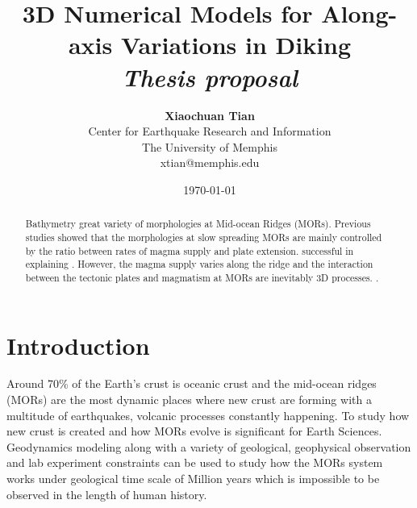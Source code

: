 \documentclass[12pt]{article}
\title{{\bf 3D Numerical Models for Along-axis Variations in Diking\note[EC]{how about adding ``at Mid-Ocean Ridges''?}} \\
\it Thesis proposal}
\author{ {\bf Xiaochuan Tian}  \\
Center for Earthquake Research and Information \\
The University of Memphis\\
{\small xtian@memphis.edu}
}
\date{\today}
\begin{document}
\pagestyle{plain}
\maketitle

\pagebreak
\begin{abstract}

Bathymetry   great variety of morphologies at Mid-ocean Ridges (MORs). Previous studies showed that the morphologies at slow spreading MORs are mainly controlled by the ratio between rates of magma supply and plate extension.  successful in explaining . However, the magma supply varies along the ridge and the interaction between the tectonic plates and magmatism at MORs are inevitably 3D processes. .

\end{abstract}

\pagebreak
\tableofcontents
\pagebreak

\cleardoublepage
{}

\section{Introduction}
\label{ch:intro}

Around 70\% of the Earth's crust is oceanic crust and the mid-ocean ridges (MORs) are the most dynamic places where new crust are forming with a multitude of earthquakes, volcanic processes constantly happening. To study how new crust is created and how MORs evolve is significant for Earth Sciences.  Geodynamics modeling along with a variety of geological, geophysical observation and lab experiment constraints can be used to study how the MORs system works under geological time scale of Million years which is impossible to be observed in the length of human history.
\end{document}

